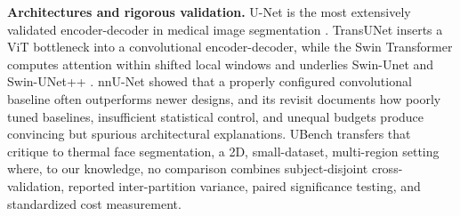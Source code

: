 \textbf{Architectures and rigorous validation.}
U-Net \cite{Ronneberger2015} is the most extensively validated encoder-decoder in medical image segmentation \cite{Siddique2021}.
TransUNet \cite{Chen2021} inserts a ViT bottleneck into a convolutional encoder-decoder, while the Swin Transformer \cite{Liu2021Swin} computes attention within shifted local windows and underlies Swin-Unet \cite{Cao2022} and Swin-UNet++ \cite{Liu2021Materials}.
nnU-Net \cite{Isensee2021} showed that a properly configured convolutional baseline often outperforms newer designs, and its revisit \cite{Isensee2024} documents how poorly tuned baselines, insufficient statistical control, and unequal budgets produce convincing but spurious architectural explanations.
UBench transfers that critique to thermal face segmentation, a 2D, small-dataset, multi-region setting where, to our knowledge, no comparison combines subject-disjoint cross-validation, reported inter-partition variance, paired significance testing, and standardized cost measurement. 
